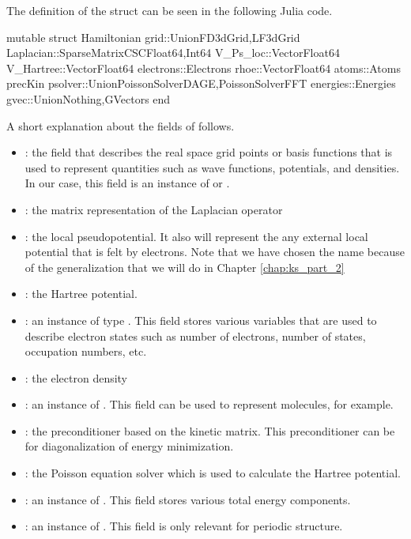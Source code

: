 The definition of the  struct can be seen in the following
Julia code.
\begin{juliacode}
mutable struct Hamiltonian
  grid::Union{FD3dGrid,LF3dGrid}
  Laplacian::SparseMatrixCSC{Float64,Int64}
  V_Ps_loc::Vector{Float64}
  V_Hartree::Vector{Float64}
  electrons::Electrons
  rhoe::Vector{Float64}
  atoms::Atoms
  precKin
  psolver::Union{PoissonSolverDAGE,PoissonSolverFFT}
  energies::Energies
  gvec::Union{Nothing,GVectors}
end
\end{juliacode}

A short explanation about the fields of  follows.
\begin{itemize}
%
  \item {}: the field that describes the real space grid points or
basis functions that is used to represent quantities such as wave functions,
potentials, and densities. In our case, this field is an instance of
 or .
%
\item {}: the matrix representation of the Laplacian operator
%
\item {}: the local pseudopotential. It also will represent the
any external local potential that is felt by electrons.
Note that we have chosen the name  because of the
generalization that we will do in Chapter \ref{chap:ks_part_2}
%
\item {}: the Hartree potential.
%
\item {}: an instance of type . This field
stores various variables that are used to describe electron states such as number
of electrons, number of states, occupation numbers, etc.
%
\item {}: the electron density
%
\item {}: an instance of . This field can be used to represent
molecules, for example.
%
\item {}: the preconditioner based on the kinetic matrix. This preconditioner
can be for diagonalization of energy minimization.
%
\item {}: the Poisson equation solver which is used to calculate the Hartree
potential.
%
\item {}: an instance of . This field stores
various total energy components.
%
\item {}: an instance of . This field is only relevant for
periodic structure.
%
\end{itemize}


